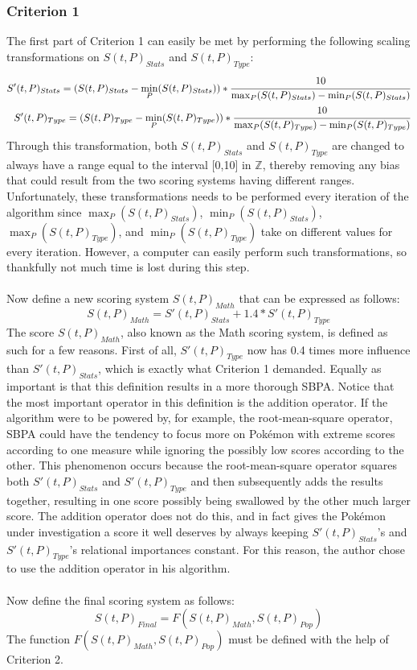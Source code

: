 \documentclass{article}
\begin{document}
\subsubsection{Criterion 1}
The first part of Criterion 1 can easily be met by performing the following scaling transformations on $S(t,P)_{Stats}$ and $S(t,P)_{Type}$:
\begin{eqnarray*}
	S'(t,P)_{Stats}=(S(t,P)_{Stats}-\min_P(S(t,P)_{Stats}))*\cfrac{10}{\max_P(S(t,P)_{Stats})-\min_P(S(t,P)_{Stats})}\\
	S'(t,P)_{Type}=(S(t,P)_{Type}-\min_P(S(t,P)_{Type}))*\cfrac{10}{\max_P(S(t,P)_{Type})-\min_P(S(t,P)_{Type})}
\end{eqnarray*}
Through this transformation, both $S(t,P)_{Stats}$ and $S(t,P)_{Type}$ are changed to always have a range equal to the interval [0,10] in $\mathbb{Z}$, thereby removing any bias that could result from the two scoring systems having different ranges. Unfortunately, these transformations needs to be performed every iteration of the algorithm since $\max_P(S(t,P)_{Stats})$, $\min_P(S(t,P)_{Stats})$, $\max_P(S(t,P)_{Type})$, and $\min_P(S(t,P)_{Type})$ take on different values for every iteration. However, a computer can easily perform such transformations, so thankfully not much time is lost during this step.\\\\
Now define a new scoring system $S(t,P)_{Math}$ that can be expressed as follows:
\begin{equation*}
	S(t,P)_{Math}=S'(t,P)_{Stats}+1.4*S'(t,P)_{Type}
\end{equation*}
The score $S(t,P)_{Math}$, also known as the Math scoring system, is defined as such for a few reasons. First of all, $S'(t,P)_{Type}$ now has 0.4 times more influence than $S'(t,P)_{Stats}$, which is exactly what Criterion 1 demanded. Equally as important is that this definition results in a more thorough SBPA. Notice that the most important operator in this definition is the addition operator. If the algorithm were to be powered by, for example, the root-mean-square operator, SBPA could have the tendency to focus more on Pok\'emon with extreme scores according to one measure while ignoring the possibly low scores according to the other. This phenomenon occurs because the root-mean-square operator squares both $S'(t,P)_{Stats}$ and $S'(t,P)_{Type}$ and then subsequently adds the results together, resulting in one score possibly being swallowed by the other much larger score. The addition operator does not do this, and in fact gives the Pok\'emon under investigation a score it well deserves by always keeping $S'(t,P)_{Stats}$'s and $S'(t,P)_{Type}$'s relational importances constant. For this reason, the author chose to use the addition operator in his algorithm.\\\\
Now define the final scoring system as follows:
\begin{equation*}
	S(t,P)_{Final}=F(S(t,P)_{Math},S(t,P)_{Pop})
\end{equation*}
The function $F(S(t,P)_{Math},S(t,P)_{Pop})$ must be defined with the help of Criterion 2.
\end{document}
